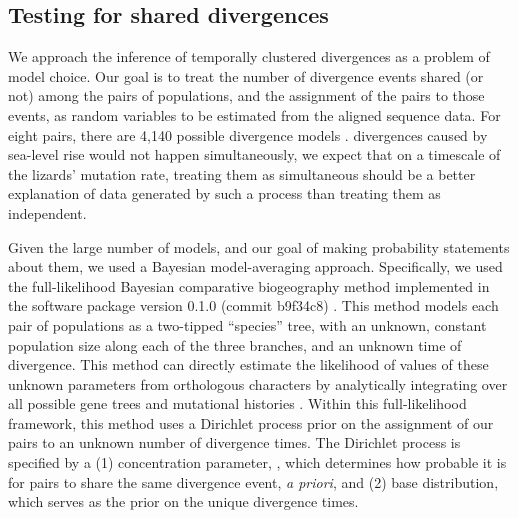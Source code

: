 \subsection{Testing for shared divergences}
We approach the inference of temporally clustered divergences as a problem of
model choice.
Our goal is to treat the number of divergence events shared (or not) among the
pairs of populations, and the assignment of the pairs to those events, as
random variables to be estimated from the aligned sequence data.
For eight pairs, there are 4,140 possible divergence models
\citep[i.e., there are 4,140 ways to partition the eight pairs to $\nevents = 1, 2,
\ldots, 8$ divergence events;][]{Bell1934,Oaks2014dpp,Oaks2018ecoevolity}.
 divergences caused by sea-level rise would not happen simultaneously,
we expect that on a timescale of the lizards' mutation rate, treating them as
simultaneous should be a better explanation of data generated by such a
process than treating them as independent.

Given the large number of models, and our goal of making probability statements
about them, we used a Bayesian model-averaging approach.
Specifically, we used the full-likelihood Bayesian comparative biogeography
method implemented in the software package \ecoevolity version 0.1.0 (commit
b9f34c8) \citep{Oaks2018ecoevolity}.
This method models each pair of populations as a two-tipped ``species'' tree,
with an unknown, constant population size along each of the three branches, and
an unknown time of divergence.
This method can directly estimate the likelihood of values of these unknown
parameters from orthologous  characters by analytically integrating
over all possible gene trees and mutational histories \citep{Bryant2012,
    Oaks2018ecoevolity}.
Within this full-likelihood framework, this method uses a Dirichlet process
prior on the assignment of our pairs to an unknown number of divergence times.
The Dirichlet process is specified by a
(1) concentration parameter, \concentration, which determines how probable it
is for pairs to share the same divergence event, \emph{a priori}, and
(2) base distribution, which serves as the prior on the unique divergence
times.

